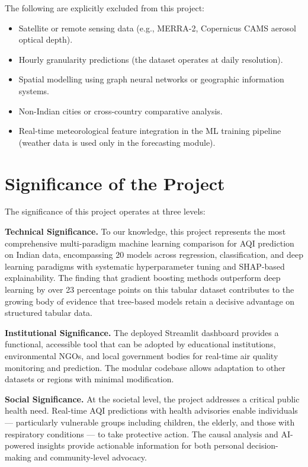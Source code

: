 \documentclass[12pt,a4paper]{report}
\begin{document}
The following are explicitly excluded from this project:

\begin{itemize}[leftmargin=2cm]
    \item Satellite or remote sensing data (e.g., MERRA-2, Copernicus CAMS aerosol optical depth).
    \item Hourly granularity predictions (the dataset operates at daily resolution).
    \item Spatial modelling using graph neural networks or geographic information systems.
    \item Non-Indian cities or cross-country comparative analysis.
    \item Real-time meteorological feature integration in the ML training pipeline (weather data is used only in the forecasting module).
\end{itemize}

\section{Significance of the Project}

The significance of this project operates at three levels:

\textbf{Technical Significance.} To our knowledge, this project represents the most comprehensive multi-paradigm machine learning comparison for AQI prediction on Indian data, encompassing 20 models across regression, classification, and deep learning paradigms with systematic hyperparameter tuning and SHAP-based explainability. The finding that gradient boosting methods outperform deep learning by over 23 percentage points on this tabular dataset contributes to the growing body of evidence that tree-based models retain a decisive advantage on structured tabular data.

\textbf{Institutional Significance.} The deployed Streamlit dashboard provides a functional, accessible tool that can be adopted by educational institutions, environmental NGOs, and local government bodies for real-time air quality monitoring and prediction. The modular codebase allows adaptation to other datasets or regions with minimal modification.

\textbf{Social Significance.} At the societal level, the project addresses a critical public health need. Real-time AQI predictions with health advisories enable individuals --- particularly vulnerable groups including children, the elderly, and those with respiratory conditions --- to take protective action. The causal analysis and AI-powered insights provide actionable information for both personal decision-making and community-level advocacy.
\end{document}
